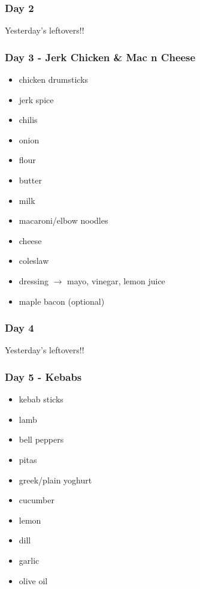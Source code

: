 \documentclass[11pt, a4paper]{article}
\begin{document}
\subsubsection{Day 2}
\vspace{1pc}
Yesterday's leftovers!!

\subsubsection{Day 3 - Jerk Chicken \& Mac n Cheese}
\vspace{1pc}
\begin{itemize}
\item chicken drumsticks 
\item jerk spice 
\item chilis 
\item onion 
\item flour 
\item butter 
\item milk 
\item macaroni/elbow noodles 
\item cheese 
\item coleslaw 
\item dressing $\longrightarrow$ mayo, vinegar, lemon juice
\item maple bacon (optional)  
\end{itemize}

\subsubsection{Day 4}
\vspace{1pc}
Yesterday's leftovers!!

\subsubsection{Day 5 - Kebabs}
\vspace{1pc}
\begin{itemize}
\item kebab sticks
\item lamb
\item bell peppers
\item pitas
\item greek/plain yoghurt
\item cucumber
\item lemon
\item dill
\item garlic
\item olive oil
\end{itemize}
\end{document}

